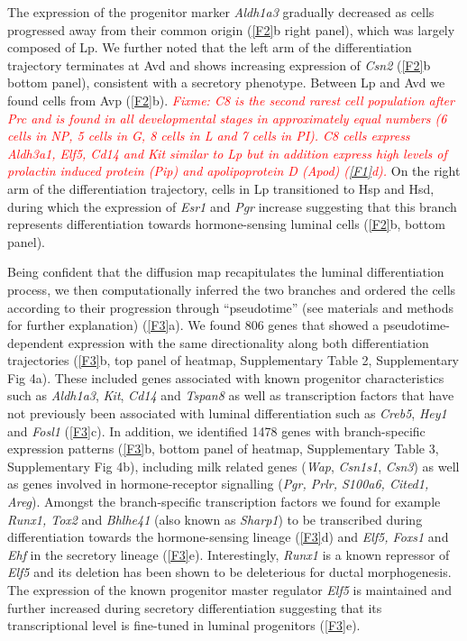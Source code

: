 \documentclass[titlepage, 12pt, oneside]{amsart}
\newcommand{\fixme}[1]{\textit{\textcolor{red}{Fixme: #1}}}
\begin{document}
The expression of the progenitor marker \textit{Aldh1a3} gradually decreased as cells progressed away from their common origin (\autoref{F2}b right panel), which was largely composed of Lp.
We further noted that the left arm of the differentiation trajectory terminates at Avd and shows increasing expression of \textit{Csn2} (\autoref{F2}b bottom panel), consistent with a secretory phenotype.
Between Lp and Avd we found cells from Avp (\autoref{F2}b).
\fixme{C8 is the second rarest cell population after Prc and is found in all developmental stages in approximately equal numbers (6 cells in NP, 5 cells in G, 8 cells in L and 7 cells in PI).
C8 cells express \textit{Aldh3a1, Elf5, Cd14 and Kit} similar to Lp but in addition express high levels of prolactin induced protein \textit{(Pip)} and apolipoprotein D \textit{(Apod)} (\autoref{F1}d).}
On the right arm of the differentiation trajectory, cells in Lp transitioned to Hsp and Hsd, during which the expression of \textit{Esr1} and \textit{Pgr} increase suggesting that this branch represents differentiation towards hormone-sensing luminal cells (\autoref{F2}b, bottom panel).

Being confident that the diffusion map recapitulates the luminal differentiation process, we then computationally inferred the two branches and ordered the cells according to their progression through ``pseudotime''\autocite{Haghverdi2016} (see materials and methods for further explanation) (\autoref{F3}a).
We found 806 genes that showed a pseudotime-dependent expression with the same directionality along both differentiation trajectories (\autoref{F3}b, top panel of heatmap, Supplementary Table 2, Supplementary Fig 4a).
These included genes associated with known progenitor characteristics such as \textit{Aldh1a3}, \textit{Kit}, \textit{Cd14} and \textit{Tspan8} as well as transcription factors that have not previously been associated with luminal differentiation such as \textit{Creb5}, \textit{Hey1} and \textit{Fosl1} (\autoref{F3}c).
In addition, we identified 1478 genes with branch-specific expression patterns (\autoref{F3}b, bottom panel of heatmap, Supplementary Table 3, Supplementary Fig 4b), including milk related genes (\textit{Wap}, \textit{Csn1s1}, \textit{Csn3}) as well as genes involved in hormone-receptor signalling (\textit{Pgr, Prlr, S100a6, Cited1, Areg}).
Amongst the branch-specific transcription factors we found for example \textit{Runx1, Tox2} and \textit{Bhlhe41} (also known as \textit{Sharp1}) to be transcribed during differentiation towards the hormone-sensing lineage (\autoref{F3}d) and \textit{Elf5, Foxs1} and \textit{Ehf} in the secretory lineage (\autoref{F3}e).
Interestingly, \textit{Runx1} is a known repressor of \textit{Elf5} and its deletion has been shown to be deleterious for ductal morphogenesis\autocite{VanBragt2014}.
The expression of the known progenitor master regulator \textit{Elf5} is maintained and further increased during secretory differentiation suggesting that its transcriptional level is fine-tuned in luminal progenitors (\autoref{F3}e).
\end{document}

